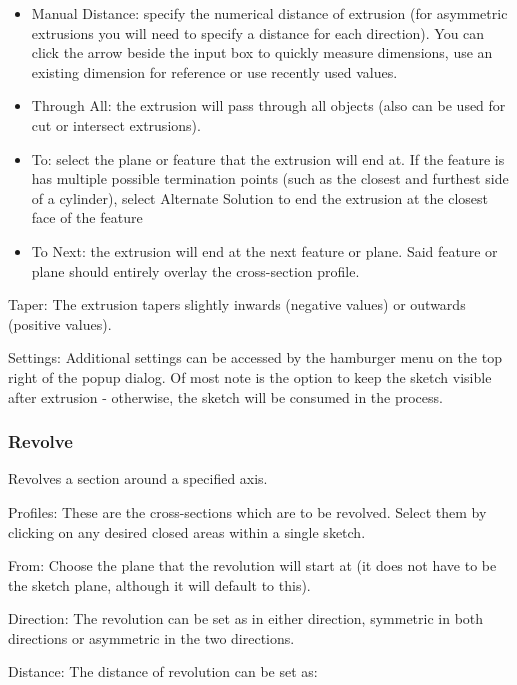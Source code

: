 \begin{itemize}
    \item Manual Distance: specify the numerical distance of extrusion (for asymmetric extrusions you will need to specify a distance for each direction). You can click the arrow beside the input box to quickly measure dimensions, use an existing dimension for reference or use recently used values.
    \item Through All: the extrusion will pass through all objects (also can be used for cut or intersect extrusions).
    \item To: select the plane or feature that the extrusion will end at. If the feature is has multiple possible termination points (such as the closest and furthest side of a cylinder), select Alternate Solution to end the extrusion at the closest face of the feature
    \item To Next: the extrusion will end at the next feature or plane. Said feature or plane should entirely overlay the cross-section profile.
\end{itemize}

Taper:
The extrusion tapers slightly inwards (negative values) or outwards (positive values).

Settings:
Additional settings can be accessed by the hamburger menu on the top right of the popup dialog. Of most note is the option to keep the sketch visible after extrusion - otherwise, the sketch will be consumed in the process.

\subsubsection{Revolve}
Revolves a section around a specified axis.

Profiles:
These are the cross-sections which are to be revolved. Select them by clicking on any desired closed areas within a single sketch.

From:
Choose the plane that the revolution will start at (it does not have to be the sketch plane, although it will default to this).

Direction:
The revolution can be set as in either direction, symmetric in both directions or asymmetric in the two directions.

Distance:
The distance of revolution can be set as:

